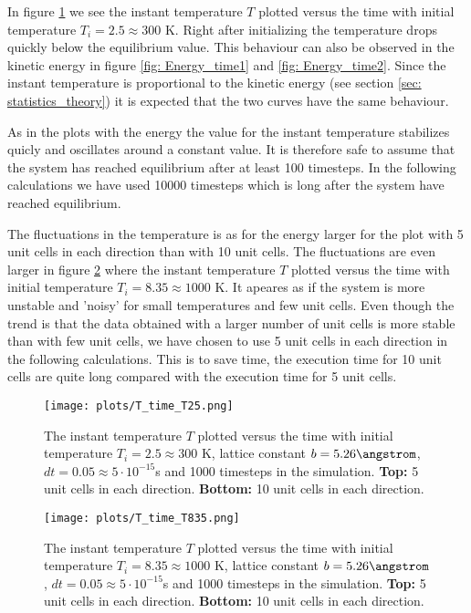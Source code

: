\documentclass[11pt,a4wide]{article}
\begin{document}
In figure \ref{fig: T_time1} we see the instant temperature $T$ plotted versus the time with initial temperature $T_i = 2.5 \approx 300$ K. Right after initializing the temperature drops quickly below the equilibrium value. This behaviour can also be observed in the kinetic energy in figure \ref{fig: Energy_time1} and \ref{fig: Energy_time2}. Since the instant temperature is proportional to the kinetic energy (see section \ref{sec: statistics_theory}) it is expected that the two curves have the same behaviour.

As in the plots with the energy the value for the instant temperature stabilizes quicly and oscillates around a constant value. It is therefore safe to assume that the system has reached equilibrium after at least 100 timesteps. In the following calculations we have used 10000 timesteps which is long after the system have reached equilibrium. 

The fluctuations in the temperature is as for the energy larger for the plot with 5 unit cells in each direction than with 10 unit cells. The fluctuations are even larger in figure \ref{fig: T_time2} where the instant temperature $T$ plotted versus the time with initial temperature $T_i = 8.35 \approx 1000$ K. It apeares as if the system is more unstable and 'noisy' for small temperatures and few unit cells. Even though the trend is that the data obtained with a larger number of unit cells is more stable than with few unit cells, we have chosen to use 5 unit cells in each direction in the following calculations. This is to save time, the execution time for 10 unit cells are quite long compared with the execution time for 5 unit cells. 

\begin{figure}[htp]
\centering
\texttt{[image: plots/T\_time\_T25.png]}
\caption{The instant temperature $T$ plotted versus the time with initial temperature $T_i = 2.5 \approx 300$ K, lattice constant $b=5.26 \angstrom$, $dt=0.05\approx  5\cdot 10^{-15}$s and 1000 timesteps in the simulation. \textbf{Top:} 5 unit cells in each direction. \textbf{Bottom:} 10 unit cells in each direction.}
\label{fig: T_time1}
\end{figure}

\begin{figure}[htp]
\centering
\texttt{[image: plots/T\_time\_T835.png]}
\caption{The instant temperature $T$ plotted versus the time with initial temperature $T_i = 8.35 \approx 1000$ K, lattice constant $b=5.26 \angstrom$, $dt=0.05\approx  5\cdot 10^{-15}$s and 1000 timesteps in the simulation. \textbf{Top:} 5 unit cells in each direction. \textbf{Bottom:} 10 unit cells in each direction.}
\label{fig: T_time2}
\end{figure}
\end{document}
